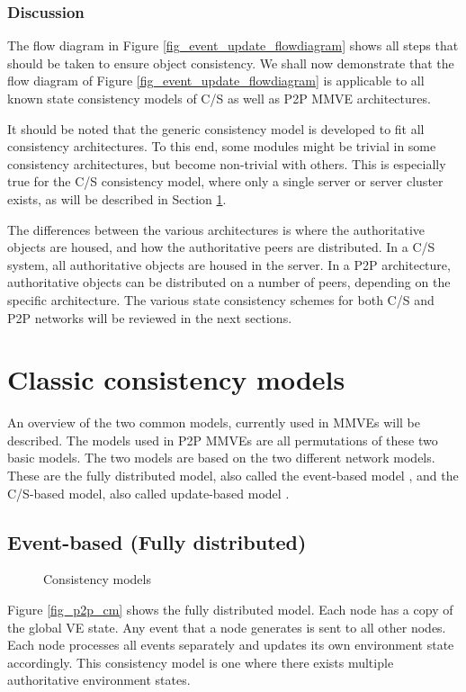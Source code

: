 \subsubsection{Discussion}

The flow diagram in Figure \ref{fig_event_update_flowdiagram} shows all steps that should be taken to ensure object consistency. We shall now demonstrate that the flow diagram of Figure \ref{fig_event_update_flowdiagram} is applicable to all known state consistency models of C/S as well as P2P MMVE architectures.

It should be noted that the generic consistency model is developed to fit all consistency architectures. To this end, some modules might be trivial in some consistency architectures, but become non-trivial with others. This is especially true for the C/S consistency model, where only a single server or server cluster exists, as will be described in Section \ref{classic_models}.

The differences between  the various architectures is where the authoritative objects are  housed, and how the authoritative peers are distributed. In a C/S system, all authoritative objects are housed in the server. In a P2P architecture, authoritative objects can be distributed on a number of peers, depending on the specific architecture. The various state consistency schemes for both C/S and P2P networks will be reviewed in the next sections.

\section{Classic consistency models}
\label{classic_models}

An overview of the two common models, currently used in MMVEs will be described. The models used in P2P MMVEs are all permutations of these two basic models. The two models are based on the two different network models. These are the fully distributed model, also called the event-based model \cite{p2p_cm_aoe}, and the C/S-based model, also called update-based model
\cite{unreal_networking}.

\subsection{Event-based (Fully distributed)}
\label{classic_event_based}

\begin{figure}[htbp]
\centering {}
\caption{Consistency models}
\end{figure}
%
Figure \ref{fig_p2p_cm} shows the fully distributed model. Each node has a copy of the global VE state. Any event that a node generates is sent to all other nodes. Each node processes all events separately and updates its own environment state accordingly. This consistency model is one where there exists multiple authoritative environment states.

